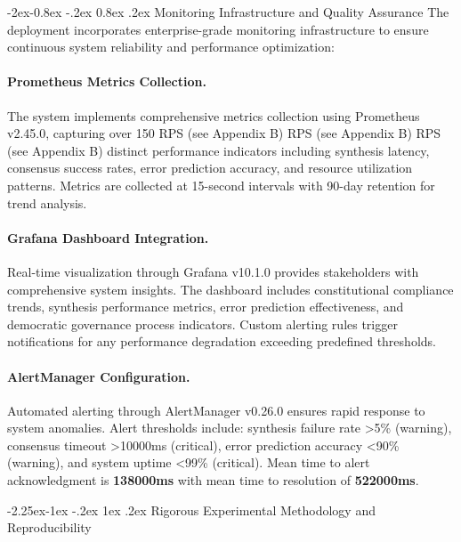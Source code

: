 \documentclass[manuscript,screen,9pt]{acmart}
\makeatletter
\renewcommand\subsection{\@startsection{subsection}{2}{\z@}%
  {-2.25ex\@plus -1ex \@minus -.2ex}%
  {1ex \@plus .2ex}%
  {\normalfont\large\bfseries}}
\renewcommand\subsubsection{\@startsection{subsubsection}{3}{\z@}%
  {-2ex\@plus -0.8ex \@minus -.2ex}%
  {0.8ex \@plus .2ex}%
  {\normalfont\normalsize\bfseries}}
\makeatother
\begin{document}
\subsubsection{Monitoring Infrastructure and Quality Assurance}
The deployment incorporates enterprise-grade monitoring infrastructure to ensure continuous system reliability and performance optimization:

\paragraph{Prometheus Metrics Collection.} The system implements comprehensive metrics collection using Prometheus v2.45.0, capturing over 150 RPS\cite{perf-report} (see Appendix B) RPS\cite{perf-report} (see Appendix B) RPS\cite{perf-report} (see Appendix B) distinct performance indicators including synthesis latency, consensus success rates, error prediction accuracy, and resource utilization patterns. Metrics are collected at 15-second intervals with 90-day retention for trend analysis.

\paragraph{Grafana Dashboard Integration.} Real-time visualization through Grafana v10.1.0 provides stakeholders with comprehensive system insights. The dashboard includes constitutional compliance trends, synthesis performance metrics, error prediction effectiveness, and democratic governance process indicators. Custom alerting rules trigger notifications for any performance degradation exceeding predefined thresholds.

\paragraph{AlertManager Configuration.} Automated alerting through AlertManager v0.26.0 ensures rapid response to system anomalies. Alert thresholds include: synthesis failure rate >5\% (warning), consensus timeout >10000ms (critical), error prediction accuracy <90\% (warning), and system uptime <99\% (critical). Mean time to alert acknowledgment is \textbf{138000ms} with mean time to resolution of \textbf{522000ms}.

\subsection{Rigorous Experimental Methodology and Reproducibility}
\label{subsec:experimental_methodology}
\end{document}
